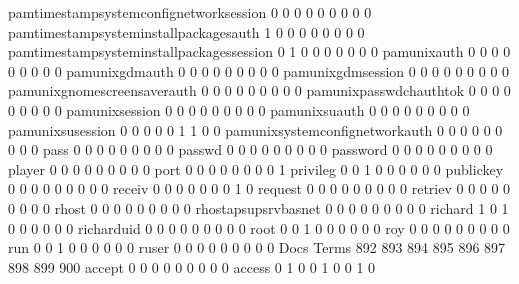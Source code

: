 \documentclass[compress,8pt]{beamer}
\begin{document}
\begin{frame}
\begin{Schunk}
  pamtimestampsystemconfignetworksession     0   0   0   0   0   0   0   0   0
  pamtimestampsysteminstallpackagesauth      1   0   0   0   0   0   0   0   0
  pamtimestampsysteminstallpackagessession   0   1   0   0   0   0   0   0   0
  pamunixauth                                0   0   0   0   0   0   0   0   0
  pamunixgdmauth                             0   0   0   0   0   0   0   0   0
  pamunixgdmsession                          0   0   0   0   0   0   0   0   0
  pamunixgnomescreensaverauth                0   0   0   0   0   0   0   0   0
  pamunixpasswdchauthtok                     0   0   0   0   0   0   0   0   0
  pamunixsession                             0   0   0   0   0   0   0   0   0
  pamunixsuauth                              0   0   0   0   0   0   0   0   0
  pamunixsusession                           0   0   0   0   0   1   1   0   0
  pamunixsystemconfignetworkauth             0   0   0   0   0   0   0   0   0
  pass                                       0   0   0   0   0   0   0   0   0
  passwd                                     0   0   0   0   0   0   0   0   0
  password                                   0   0   0   0   0   0   0   0   0
  player                                     0   0   0   0   0   0   0   0   0
  port                                       0   0   0   0   0   0   0   0   1
  privileg                                   0   0   1   0   0   0   0   0   0
  publickey                                  0   0   0   0   0   0   0   0   0
  receiv                                     0   0   0   0   0   0   0   1   0
  request                                    0   0   0   0   0   0   0   0   0
  retriev                                    0   0   0   0   0   0   0   0   0
  rhost                                      0   0   0   0   0   0   0   0   0
  rhostapsupsrvbasnet                        0   0   0   0   0   0   0   0   0
  richard                                    1   0   1   0   0   0   0   0   0
  richarduid                                 0   0   0   0   0   0   0   0   0
  root                                       0   0   1   0   0   0   0   0   0
  roy                                        0   0   0   0   0   0   0   0   0
  run                                        0   0   1   0   0   0   0   0   0
  ruser                                      0   0   0   0   0   0   0   0   0
                                          Docs
Terms                                      892 893 894 895 896 897 898 899 900
  accept                                     0   0   0   0   0   0   0   0   0
  access                                     0   1   0   0   1   0   0   1   0

\end{Schunk}
\end{frame}
\end{document}
